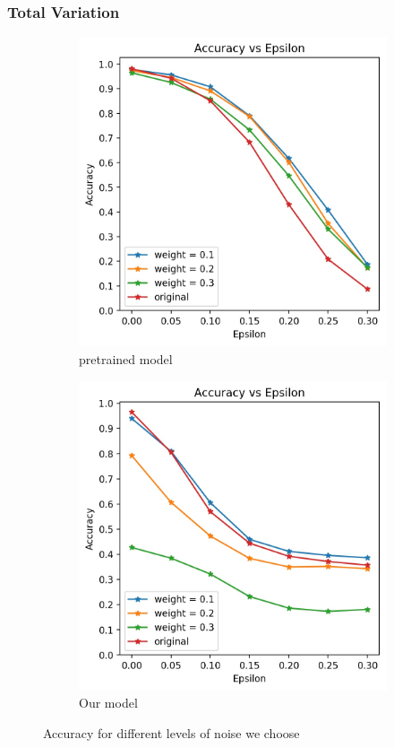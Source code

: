 \subsubsection{Total Variation}
\begin{figure}[h!]
	\centering
	\begin{subfigure}{.4\textwidth}
		\includegraphics[width=\textwidth]{pretrained_Accuracy_vs_Epsilon_tv.jpg}
		\caption{pretrained model}
		\label{fig: tv pre}
	\end{subfigure}
	\begin{subfigure}{.4\textwidth}
		\includegraphics[width=\textwidth]{Accuracy_vs_Epsilon_tv.jpg}
		\caption{Our model}
		\label{fig: tv us}
	\end{subfigure}
	\caption{Accuracy for different levels of noise we choose}
\end{figure}


